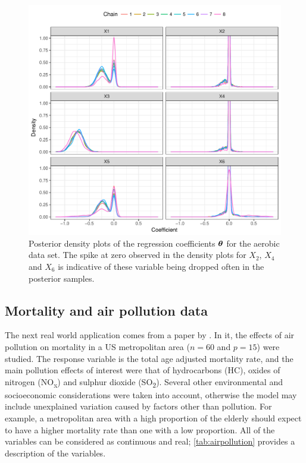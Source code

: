 \documentclass[11pt,twoside,openright]{report}
\begin{document}
\begin{figure}[H]
  \centering
  \includegraphics[width=\textwidth]{figure/06-aerobic_coef}
  \caption[Posterior density plots of the regression coefficients for the aerobic data set.]{Posterior density plots of the regression coefficients ${\bm\theta}$ for the aerobic data set. The spike at zero observed in the density plots for $X_2$, $X_4$ and $X_6$ is indicative of these variable being dropped often in the posterior samples.}
  \label{fig:aerobic-densplot}
\end{figure}

\subsection{Mortality and air pollution data}
\label{sec:airpollution}

The next real world application comes from a paper by \citet{McDonald1973}. 
In it, the effects of air pollution on mortality in a US metropolitan area ($n=60$ and $p=15$) were studied. 
The response variable is the total age adjusted mortality rate, and the main pollution effects of interest were that of hydrocarbons (HC), oxides of nitrogen (NO\textsubscript{x}) and sulphur dioxide (SO\textsubscript{2}). 
Several other environmental and socioeconomic considerations were taken into account, otherwise the model may include unexplained variation caused by factors other than pollution. 
For example, a metropolitan area with a high proportion of the elderly should expect to have a higher mortality rate than one with a low proportion. 
All of the variables can be considered as continuous and real; \cref{tab:airpollution} provides a description of the variables.
\end{document}

